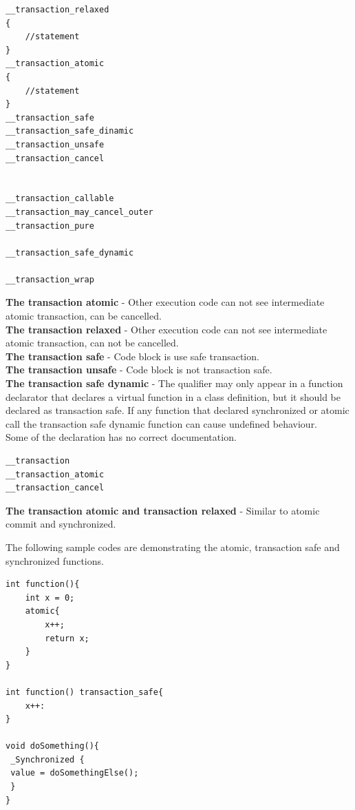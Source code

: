 \documentclass[12pt]{article}
\begin{document}
\begin{lstlisting}
__transaction_relaxed
{
	//statement
}
__transaction_atomic
{
	//statement
} 
__transaction_safe
__transaction_safe_dinamic
__transaction_unsafe
__transaction_cancel


__transaction_callable
__transaction_may_cancel_outer
__transaction_pure

__transaction_safe_dynamic

__transaction_wrap
\end{lstlisting}
{\setlength{\parindent}{0cm}
\textbf{The transaction atomic} - Other execution code can not see intermediate atomic transaction, can be cancelled.\\

\textbf{The transaction relaxed} -  Other execution code can not see intermediate atomic transaction, can not be cancelled.\\

\textbf{The transaction safe}   - Code block is use safe transaction.\\

\textbf{The transaction unsafe} - Code block is not transaction safe.\\

\textbf{The transaction safe dynamic} - The qualifier may only appear in a function declarator that declares a virtual function in a class definition, but it should be declared as transaction safe. If any function that declared synchronized or atomic call the transaction safe dynamic function can cause undefined behaviour.\\

Some of the declaration has no correct documentation.
}\cite{Torvald}

\begin{lstlisting}
__transaction
__transaction_atomic
__transaction_cancel
\end{lstlisting}
{\setlength{\parindent}{0cm}
\textbf{The transaction atomic and transaction relaxed} - Similar to atomic commit and synchronized.\cite{Torvald}\\
}

{\setlength{\parindent}{0cm}
The following sample codes are demonstrating the atomic, transaction safe and synchronized functions.\\
}
\begin{lstlisting}
int function(){
	int x = 0;
	atomic{
		x++;
		return x;
	}
}

int function() transaction_safe{
	x++:
}

void doSomething(){
 _Synchronized {
 value = doSomethingElse();
 }
}
\end{lstlisting}
\end{document}
